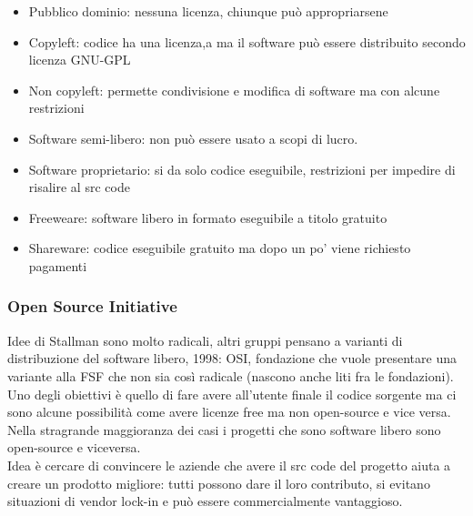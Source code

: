\documentclass{article}
\begin{document}
\begin{itemize}
\item Pubblico dominio: nessuna licenza, chiunque può appropriarsene
\item Copyleft: codice ha una licenza,a ma il software può essere distribuito secondo licenza GNU-GPL
\item Non copyleft: permette condivisione e modifica di software ma con alcune restrizioni
\item Software semi-libero: non può essere usato a scopi di lucro.
\item Software proprietario: si da solo codice eseguibile, restrizioni per impedire di risalire al src code
\item Freeweare: software libero in formato eseguibile a titolo gratuito
\item Shareware: codice eseguibile gratuito ma dopo un po' viene richiesto pagamenti
\end{itemize}
\subsubsection{Open Source Initiative}
Idee di Stallman sono molto radicali, altri gruppi pensano a varianti di distribuzione del software libero, 1998: OSI, fondazione che vuole presentare una variante alla FSF che non sia così radicale (nascono anche liti fra le fondazioni).\\ Uno degli obiettivi è quello di fare avere all'utente finale il codice sorgente ma ci sono alcune possibilità come avere licenze free ma non open-source e vice versa.\\ Nella stragrande maggioranza dei casi i progetti che sono software libero sono open-source e viceversa.\\ Idea è cercare di convincere le aziende che avere il src code del progetto aiuta a creare un prodotto migliore: tutti possono dare il loro contributo, si evitano situazioni di vendor lock-in e può essere commercialmente vantaggioso.
\end{document}
